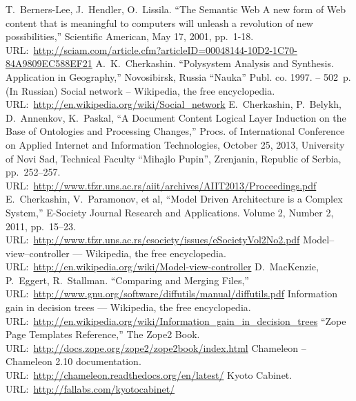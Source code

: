 \documentclass[conference]{IEEEtran}
\begin{document}
%
%
%
\vspace{1.4em} %
\begin{thebibliography}{11}
 T.~Berners-Lee, J.~Hendler, O.~Lissila. ``The
  Semantic Web A new form of Web content that is meaningful to
  computers will unleash a revolution of new possibilities,''
  Scientific American, May 17, 2001,
  pp.~1-18. URL:~\url{http://sciam.com/article.cfm?articleID=00048144-10D2-1C70-84A9809EC588EF21}
 A.~K.~Cherkashin. ``Polysystem Analysis and
  Synthesis. Application in Geography,'' Novosibirsk, Russia ``Nauka'' Publ. co.
  1997. -- 502~p. (In Russian)
 Social network -- Wikipedia, the free encyclopedia.
  URL:~\url{http://en.wikipedia.org/wiki/Social_network}
 E.~Cherkashin, P.~Belykh, D.~Annenkov, K.~Paskal, ``A
  Document Content Logical Layer Induction on the Base of Ontologies
  and Processing Changes,'' Procs. of International Conference on
  Applied Internet and Information Technologies, October 25, 2013,
  University of Novi Sad, Technical Faculty ``Mihajlo Pupin'',
  Zrenjanin, Republic of Serbia,
  pp.~252--257. URL:~\url{http://www.tfzr.uns.ac.rs/aiit/archives/AIIT2013/Proceedings.pdf}
 E.~Cherkashin, V.~Paramonov, et al, ``Model Driven
  Architecture is a Complex System,'' E-Society Journal Research and
  Applications. Volume 2, Number 2, 2011, pp.~15--23.
  URL:~\url{http://www.tfzr.uns.ac.rs/esociety/issues/eSocietyVol2No2.pdf}
 Model--view--controller --- Wikipedia, the free
  encyclopedia.
  URL:~\url{http://en.wikipedia.org/wiki/Model-view-controller}
 D.~MacKenzie, P.~Eggert, R.~Stallman. ``Comparing and
  Merging Files,''
  URL:~\url{http://www.gnu.org/software/diffutils/manual/diffutils.pdf}
 Information gain in decision trees ---  Wikipedia, the free
  encyclopedia. URL:~\url{http://en.wikipedia.org/wiki/Information_gain_in_decision_trees}
 ``Zope Page Templates Reference,'' The Zope2 Book. URL:~\url{http://docs.zope.org/zope2/zope2book/index.html}
 Chameleon -- Chameleon 2.10 documentation.
  URL:~\url{http://chameleon.readthedocs.org/en/latest/}
 Kyoto Cabinet. URL:~\url{http://fallabs.com/kyotocabinet/}
\end{thebibliography}
\vspace{-2em}\mbox{} %
\end{document}
